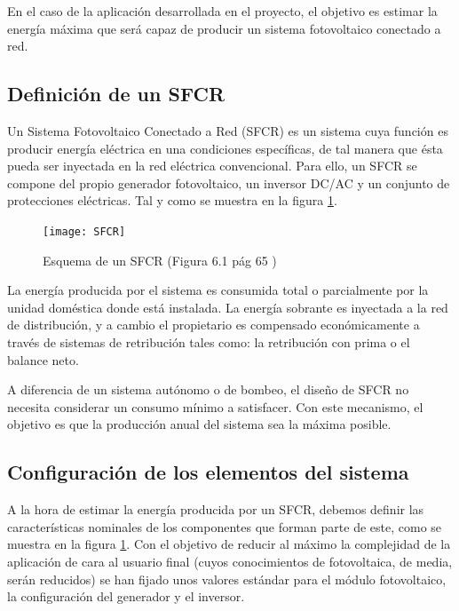 En el caso de la aplicación desarrollada en el proyecto, el objetivo es estimar la energía máxima que será capaz de producir un sistema fotovoltaico conectado a red.

\subsection{Definición de un SFCR}

Un Sistema Fotovoltaico Conectado a Red (SFCR) es un sistema cuya función es producir energía eléctrica en una condiciones específicas, de tal manera que ésta pueda ser inyectada en la red eléctrica convencional. Para ello, un SFCR se compone del propio generador fotovoltaico, un inversor DC/AC y un conjunto de protecciones eléctricas. Tal y como se muestra en la figura \ref{fig:sfcr}.

\begin{figure}[ht]
\texttt{[image: SFCR]}
\centering
\caption{Esquema de un SFCR (Figura 6.1 pág 65 \cite{esf_book})}
\label{fig:sfcr}
\end{figure}

La energía producida por el sistema es consumida total o parcialmente por la unidad doméstica donde está instalada. La energía sobrante es inyectada a la red de distribución, y a cambio el propietario es compensado económicamente a través de sistemas de retribución tales como: la retribución con prima o el balance neto.

A diferencia de un sistema autónomo o de bombeo, el diseño de SFCR no necesita considerar un consumo mínimo a satisfacer. Con este mecanismo, el objetivo es que la producción anual del sistema sea la máxima posible.

\subsection{Configuración de los elementos del sistema}

A la hora de estimar la energía producida por un SFCR, debemos definir las características nominales de los componentes que forman parte de este, como se muestra en la figura \ref{fig:sfcr}.
Con el objetivo de reducir al máximo la complejidad de la aplicación de cara al usuario final (cuyos conocimientos de fotovoltaica, de media, serán reducidos) se han fijado unos valores estándar para el módulo fotovoltaico, la configuración del generador y el inversor.

